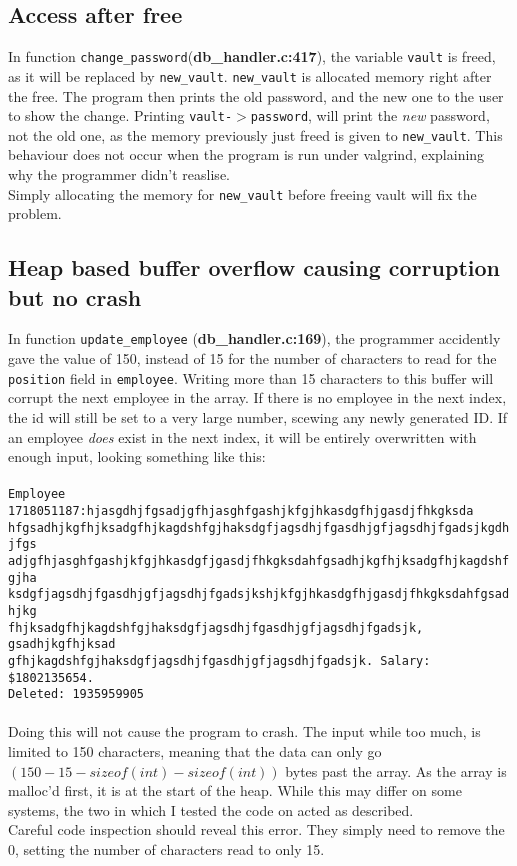 \documentclass[]{article}
\begin{document}
\subsection*{Access after free}
In function \texttt{change\_password}(\textbf{db\_handler.c:417}), the variable \texttt{vault} is freed, as it will be replaced by \texttt{new\_vault}. \texttt{new\_vault} is allocated memory right after the free. The program then prints the old password, and the new one to the user to show the change. Printing \texttt{vault-$>$password}, will print the \textit{new} password, not the old one, as the memory previously just freed is given to \texttt{new\_vault}. This behaviour does not occur when the program is run under valgrind, explaining why the programmer didn't reaslise.
\\
Simply allocating the memory for \texttt{new\_vault} before freeing vault will fix the problem.

\subsection*{Heap based buffer overflow causing corruption but no crash}
In function \texttt{update\_employee} (\textbf{db\_handler.c:169}), the programmer accidently gave the value of 150, instead of 15 for the number of characters to read for the \texttt{position} field in \texttt{employee}.
Writing more than 15 characters to this buffer will corrupt the next employee in the array. If there is no employee in the next index, the id will still be set to a very large number, scewing any newly generated ID.
If an employee \textit{does} exist in the next index, it will be entirely overwritten with enough input, looking 
something like this:\\
\\
\pagebreak
 \texttt{Employee 1718051187:hjasgdhjfgsadjgfhjasghfgashjkfgjhkasdgfhjgasdjfhkgksda\\
 	hfgsadhjkgfhjksadgfhjkagdshfgjhaksdgfjagsdhjfgasdhjgfjagsdhjfgadsjkgdhjfgs\\
 	adjgfhjasghfgashjkfgjhkasdgfjgasdjfhkgksdahfgsadhjkgfhjksadgfhjkagdshfgjha\\
 	ksdgfjagsdhjfgasdhjgfjagsdhjfgadsjkshjkfgjhkasdgfhjgasdjfhkgksdahfgsadhjkg\\
 	fhjksadgfhjkagdshfgjhaksdgfjagsdhjfgasdhjgfjagsdhjfgadsjk, gsadhjkgfhjksad\\
 	gfhjkagdshfgjhaksdgfjagsdhjfgasdhjgfjagsdhjfgadsjk. Salary: \$1802135654. \\
 	Deleted: 1935959905}
 \\
 \\
Doing this will not cause the program to crash. The input while too much, is limited to 150 characters, meaning that the data can only go $(150 - 15 - sizeof(int) - sizeof(int))$ bytes past the array. As the array is malloc'd first, it is at the start of the heap. While this may differ on some systems, the two in which I tested the code on acted as described. 
\\
Careful code inspection should reveal this error. They simply need to remove the 0, setting the number of characters read to only 15.
\end{document}
